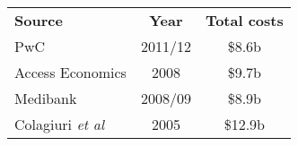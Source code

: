 \bgroup
\def\arraystretch{1.2}
\begin{tabular}{lcc}
\toprule
\textbf{Source} & \textbf{Year} & \textbf{Total costs} \\ \cmidrule(lr){1-3}
PwC & 2011/12 & \$8.6b \\
Access Economics & 2008 & \$9.7b \\
Medibank & 2008/09 & \$8.9b \\
Colagiuri \emph{et al } & 2005 & \$12.9b \\
\bottomrule
\end{tabular}
\egroup